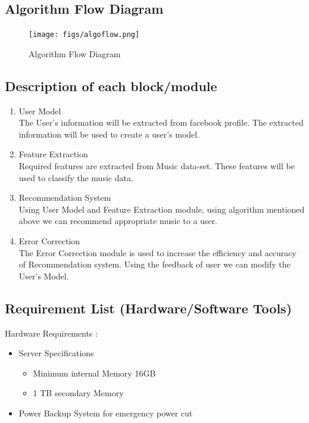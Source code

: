 \documentclass[a4paper,12pt]{article}
\begin{document}
\subsection{Algorithm Flow Diagram}
\begin{figure}[ht!]
  \centering
  \texttt{[image: figs/algoflow.png]}
  \caption{Algorithm Flow Diagram \label{fig:algoflow}}
\end{figure}

\subsection{Description of each block/module}

\begin{enumerate}
\item User Model\\
  The User's information will be extracted from facebook profile. The extracted information will be used to create a user's model.
\item Feature Extraction\\
  Required features are extracted from Music data-set. These features will be used to classify the music data.
\item Recommendation System\\
  Using User Model and Feature Extraction module, using algorithm mentioned above we can recommend appropriate music to a user.
\item Error Correction\\
  The Error Correction module is used to increase the efficiency and accuracy of Recommendation system. Using the feedback of user we can modify the User's Model.
\end{enumerate}
\cleardoublepage


\subsection{Requirement List (Hardware/Software Tools)}
Hardware Requirements :
\begin{itemize}
\item Server Specifications
  \begin{itemize}
  \item Minimum internal Memory 16GB
  \item 1 TB secondary Memory
  \end{itemize}
\item Power Backup System for emergency power cut
\end{itemize}
\end{document}
